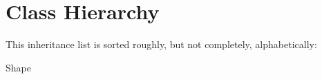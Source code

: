 \section{Class Hierarchy}
This inheritance list is sorted roughly, but not completely, alphabetically\+:\begin{DoxyCompactList}
\item {}
\item Shape\begin{DoxyCompactList}
\item {}
\end{DoxyCompactList}
\item {}
\item {}
\end{DoxyCompactList}
